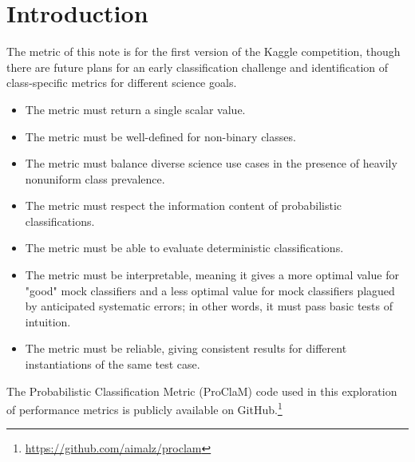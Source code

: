 \section{Introduction}
\label{sec:intro}

The metric of this note is for the first version of the Kaggle competition, though there are future plans for an early classification challenge and identification of class-specific metrics for different science goals.

\begin{itemize}
\item    The metric must return a single scalar value.
\item    The metric must be well-defined for non-binary classes.
\item    The metric must balance diverse science use cases in the presence of heavily nonuniform class prevalence.
\item    The metric must respect the information content of probabilistic classifications.
\item    The metric must be able to evaluate deterministic classifications.
\item    The metric must be interpretable, meaning it gives a more optimal value for "good" mock classifiers and a less optimal value for mock classifiers plagued by anticipated systematic errors; in other words, it must pass basic tests of intuition.
\item    The metric must be reliable, giving consistent results for different instantiations of the same test case.
\end{itemize}

The Probabilistic Classification Metric (ProClaM) code used in this exploration of performance metrics is publicly available on GitHub.\footnote{\url{https://github.com/aimalz/proclam}}

